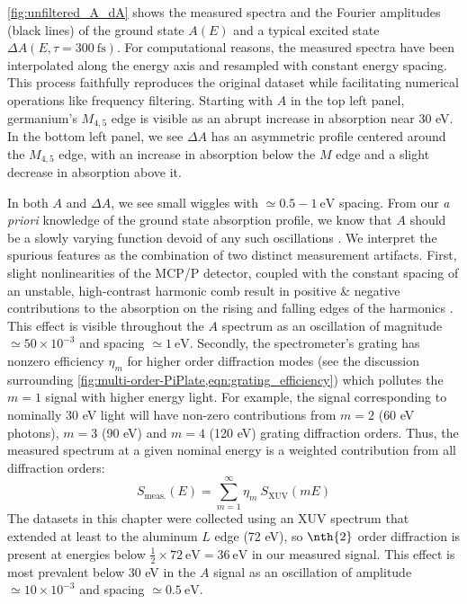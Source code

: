 \cref{fig:unfiltered_A_dA} shows the measured spectra and the Fourier amplitudes (black lines) of the ground state $A(E)$ and a typical excited state $\Delta A(E, \tau=300 \ \textrm{fs})$. For computational reasons, the measured spectra have been interpolated along the energy axis and resampled with constant energy spacing. This process faithfully reproduces the original dataset while facilitating numerical operations like frequency filtering. Starting with $A$ in the top left panel, germanium's $M_{4,5}$ edge is visible as an abrupt increase in absorption near 30 eV. In the bottom left panel, we see $\Delta A$ has an asymmetric profile centered around the $M_{4,5}$ edge, with an increase in absorption below the $M$ edge and a slight decrease in absorption above it.

In both $A$ and $\Delta A$, we see small wiggles with $\simeq 0.5 - 1 \ \textrm{eV}$ spacing. From our \textit{a priori} knowledge of the ground state absorption profile, we know that $A$ should be a slowly varying function devoid of any such oscillations \cite{zurchDirectSimultaneousObservation2017}. We interpret the spurious features as the combination of two distinct measurement artifacts. First, slight nonlinearities of the MCP/P detector, coupled with the constant spacing of an unstable, high-contrast harmonic comb result in positive \& negative contributions to the absorption on the rising and falling edges of the harmonics \cite{linImpactSpatialChirp2016,cirriAchievingSurfaceSensitivity2017}. This effect is visible throughout the $A$ spectrum as an oscillation of magnitude $\simeq 50 \times 10^{-3}$ and spacing $\simeq 1 \ \textrm{eV}$. Secondly, the spectrometer's grating has nonzero efficiency $\eta_m$ for higher order diffraction modes (see the discussion surrounding \cref{fig:multi-order-PiPlate,eqn:grating_efficiency}) which pollutes the $m=1$ signal with higher energy light. For example, the signal corresponding to nominally {30 eV} light will have non-zero contributions from $m=2$ ({60 eV} photons), $m=3$ ({90 eV}) and $m=4$ ({120 eV}) grating diffraction orders. Thus, the measured spectrum at a given nominal energy is a weighted contribution from all diffraction orders:
\begin{equation}
S_{\textrm{meas.}}(E) = \sum_{m=1}^{\infty} \eta_m \ S_{\textrm{XUV}}(mE)
\end{equation}
The datasets in this chapter were collected using an XUV spectrum that extended at least to the aluminum $L$ edge (72 eV), so $\nth{2}$ order diffraction is present at energies below ${\frac{1}{2} \times 72 \ \textrm{eV} = 36 \ \textrm{eV}}$ in our measured signal. This effect is most prevalent below 30 eV in the $A$ signal as an oscillation of amplitude $\simeq 10 \times 10^{-3}$ and spacing $\simeq 0.5 \ \textrm{eV}$.

